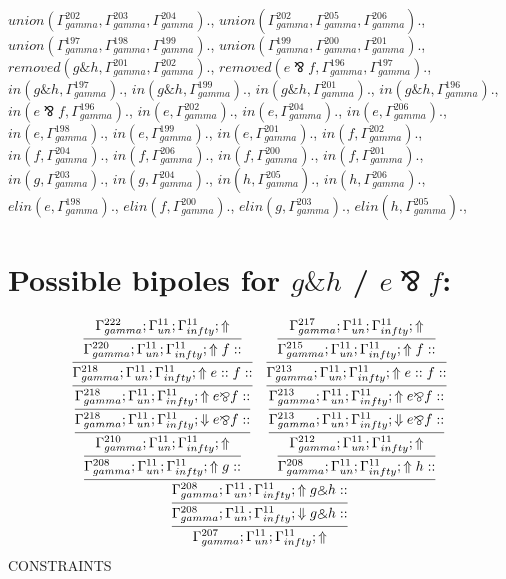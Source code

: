 \documentclass[a4paper, 11pt]{article}
\begin{document}
$union(\Gamma_{gamma}^{202}, \Gamma_{gamma}^{203}, \Gamma_{gamma}^{204}).$, $union(\Gamma_{gamma}^{202}, \Gamma_{gamma}^{205}, \Gamma_{gamma}^{206}).$, $union(\Gamma_{gamma}^{197}, \Gamma_{gamma}^{198}, \Gamma_{gamma}^{199}).$, $union(\Gamma_{gamma}^{199}, \Gamma_{gamma}^{200}, \Gamma_{gamma}^{201}).$, $removed(g \binampersand h, \Gamma_{gamma}^{201}, \Gamma_{gamma}^{202}).$, $removed(e \bindnasrepma f, \Gamma_{gamma}^{196}, \Gamma_{gamma}^{197}).$, $in(g \binampersand h, \Gamma_{gamma}^{197}).$, $in(g \binampersand h, \Gamma_{gamma}^{199}).$, $in(g \binampersand h, \Gamma_{gamma}^{201}).$, $in(g \binampersand h, \Gamma_{gamma}^{196}).$, $in(e \bindnasrepma f, \Gamma_{gamma}^{196}).$, $in(e, \Gamma_{gamma}^{202}).$, $in(e, \Gamma_{gamma}^{204}).$, $in(e, \Gamma_{gamma}^{206}).$, $in(e, \Gamma_{gamma}^{198}).$, $in(e, \Gamma_{gamma}^{199}).$, $in(e, \Gamma_{gamma}^{201}).$, $in(f, \Gamma_{gamma}^{202}).$, $in(f, \Gamma_{gamma}^{204}).$, $in(f, \Gamma_{gamma}^{206}).$, $in(f, \Gamma_{gamma}^{200}).$, $in(f, \Gamma_{gamma}^{201}).$, $in(g, \Gamma_{gamma}^{203}).$, $in(g, \Gamma_{gamma}^{204}).$, $in(h, \Gamma_{gamma}^{205}).$, $in(h, \Gamma_{gamma}^{206}).$, $elin(e, \Gamma_{gamma}^{198}).$, $elin(f, \Gamma_{gamma}^{200}).$, $elin(g, \Gamma_{gamma}^{203}).$, $elin(h, \Gamma_{gamma}^{205}).$, 
\section{Possible bipoles for $g \binampersand h$ / $e \bindnasrepma f$:} 

{\small
\[
\infer{\Gamma_{ gamma}^{207} ; \Gamma_{un}^{11} ; \Gamma_{ infty}^{11} ;  \Uparrow }
{\infer{\Gamma_{ gamma}^{208} ; \Gamma_{un}^{11} ; \Gamma_{ infty}^{11} ;  \Downarrow g \binampersand h :: }
{\infer{\Gamma_{ gamma}^{208} ; \Gamma_{un}^{11} ; \Gamma_{ infty}^{11} ;  \Uparrow g \binampersand h :: }
{\infer{\Gamma_{ gamma}^{208} ; \Gamma_{un}^{11} ; \Gamma_{ infty}^{11} ;  \Uparrow g :: }
{\infer{\Gamma_{ gamma}^{210} ; \Gamma_{un}^{11} ; \Gamma_{ infty}^{11} ;  \Uparrow }
{\infer{\Gamma_{ gamma}^{218} ; \Gamma_{un}^{11} ; \Gamma_{ infty}^{11} ;  \Downarrow e \bindnasrepma f :: }
{\infer{\Gamma_{ gamma}^{218} ; \Gamma_{un}^{11} ; \Gamma_{ infty}^{11} ;  \Uparrow e \bindnasrepma f :: }
{\infer{\Gamma_{ gamma}^{218} ; \Gamma_{un}^{11} ; \Gamma_{ infty}^{11} ;  \Uparrow e :: f :: }
{\infer{\Gamma_{ gamma}^{220} ; \Gamma_{un}^{11} ; \Gamma_{ infty}^{11} ;  \Uparrow f :: }
{\Gamma_{ gamma}^{222} ; \Gamma_{un}^{11} ; \Gamma_{ infty}^{11} ;  \Uparrow }}}}}}
&
\infer{\Gamma_{ gamma}^{208} ; \Gamma_{un}^{11} ; \Gamma_{ infty}^{11} ;  \Uparrow h :: }
{\infer{\Gamma_{ gamma}^{212} ; \Gamma_{un}^{11} ; \Gamma_{ infty}^{11} ;  \Uparrow }
{\infer{\Gamma_{ gamma}^{213} ; \Gamma_{un}^{11} ; \Gamma_{ infty}^{11} ;  \Downarrow e \bindnasrepma f :: }
{\infer{\Gamma_{ gamma}^{213} ; \Gamma_{un}^{11} ; \Gamma_{ infty}^{11} ;  \Uparrow e \bindnasrepma f :: }
{\infer{\Gamma_{ gamma}^{213} ; \Gamma_{un}^{11} ; \Gamma_{ infty}^{11} ;  \Uparrow e :: f :: }
{\infer{\Gamma_{ gamma}^{215} ; \Gamma_{un}^{11} ; \Gamma_{ infty}^{11} ;  \Uparrow f :: }
{\Gamma_{ gamma}^{217} ; \Gamma_{un}^{11} ; \Gamma_{ infty}^{11} ;  \Uparrow }}}}}}}}}
\]
}
CONSTRAINTS
\end{document}
